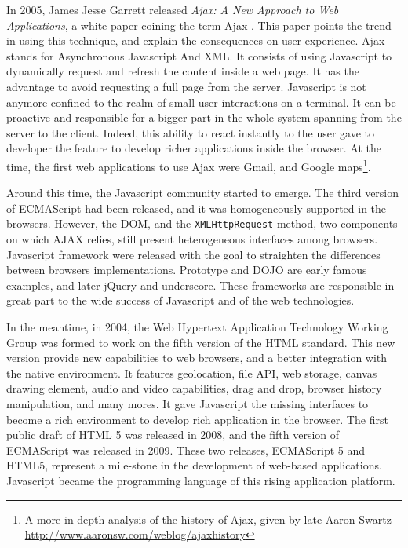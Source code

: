 In 2005, James Jesse Garrett released \textit{Ajax: A New Approach to Web Applications}, a white paper coining the term Ajax \cite{Garrett2005}.
This paper points the trend in using this technique, and explain the consequences on user experience.
Ajax stands for Asynchronous Javascript And XML.
It consists of using Javascript to dynamically request and refresh the content inside a web page.
It has the advantage to avoid requesting a full page from the server.
Javascript is not anymore confined to the realm of small user interactions on a terminal.
It can be proactive and responsible for a bigger part in the whole system spanning from the server to the client.
Indeed, this ability to react instantly to the user gave to developer the feature to develop richer applications inside the browser.
At the time, the first web applications to use Ajax were Gmail, and Google maps\footnote{A more in-depth analysis of the history of Ajax, given by late Aaron Swartz \url{http://www.aaronsw.com/weblog/ajaxhistory}}.

Around this time, the Javascript community started to emerge.
The third version of ECMAScript had been released, and it was homogeneously supported in the browsers.
However, the DOM, and the \texttt{XMLHttpRequest} method, two components on which AJAX relies, still present heterogeneous interfaces among browsers.
Javascript framework were released with the goal to straighten the differences between browsers implementations.
Prototype and DOJO are early famous examples, and later jQuery and underscore.
These frameworks are responsible in great part to the wide success of Javascript and of the web technologies.

In the meantime, in 2004, the Web Hypertext Application Technology Working Group was formed to work on the fifth version of the HTML standard.
This new version provide new capabilities to web browsers, and a better integration with the native environment.
It features geolocation, file API, web storage, canvas drawing element, audio and video capabilities, drag and drop, browser history manipulation, and many mores.
It gave Javascript the missing interfaces to become a rich environment to develop rich application in the browser.
The first public draft of HTML 5 was released in 2008, and the fifth version of ECMAScript was released in 2009.
These two releases, ECMAScript 5 and HTML5, represent a mile-stone in the development of web-based applications.
Javascript became the programming language of this rising application platform.

